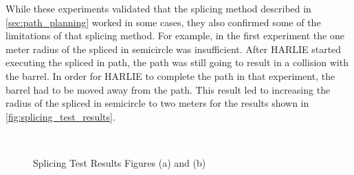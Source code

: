 While these experiments validated that the splicing method described in \autoref{sec:path_planning} worked in some cases, they also confirmed some of the limitations of that splicing method. For example, in the first experiment the one meter radius of the spliced in semicircle was insufficient. After HARLIE started executing the spliced in path, the path was still going to result in a collision with the barrel. In order for HARLIE to complete the path in that experiment, the barrel had to be moved away from the path. This result led to increasing the radius of the spliced in semicircle to two meters for the results shown in \autoref{fig:splicing_test_results}.

\begin{figure}
\centering
{}
\\
\caption[Splicing Test Results Figures (a) and (b)]{Splicing Test Results  Figures (a) and (b)}
\end{figure}

